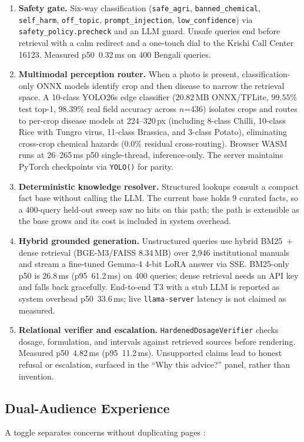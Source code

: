 \begin{enumerate}
    \item \textbf{Safety gate.} Six-way classification (\texttt{safe\_agri}, \texttt{banned\_chemical}, \texttt{self\_harm}, \texttt{off\_topic}, \texttt{prompt\_injection}, \texttt{low\_confidence}) via \texttt{safety\_policy.precheck} and an LLM guard. Unsafe queries end before retrieval with a calm redirect and a one-touch dial to the Krishi Call Center 16123. Measured p50~0.32\,ms on 400 Bengali queries.
    \item \textbf{Multimodal perception router.} When a photo is present, classification-only ONNX models identify crop and then disease to narrow the retrieval space. A 10-class YOLO26s edge classifier ($20.82$\,MB ONNX/TFLite, $99.55\%$ test top-1, $98.39\%$ real field accuracy across $n$=436) isolates crops and routes to per-crop disease models at 224--320\,px (including 8-class Chilli, 10-class Rice with Tungro virus, 11-class Brassica, and 3-class Potato), eliminating cross-crop chemical hazards ($0.0\%$ residual cross-routing). Browser WASM runs at 26--265\,ms p50 single-thread, inference-only. The server maintains PyTorch checkpoints via \texttt{YOLO()} for parity.
    \item \textbf{Deterministic knowledge resolver.} Structured lookups consult a compact fact base without calling the LLM. The current base holds 9 curated facts, so a 400-query held-out sweep saw no hits on this path; the path is extensible as the base grows and its cost is included in system overhead.
    \item \textbf{Hybrid grounded generation.} Unstructured queries use hybrid BM25~+ dense retrieval (BGE-M3/FAISS 8.34\,MB) over 2,946 institutional manuals and stream a fine-tuned Gemma-4 4-bit LoRA answer via SSE. BM25-only p50 is 26.8\,ms (p95~61.2\,ms) on 400 queries; dense retrieval needs an API key and falls back gracefully. End-to-end T3 with a stub LLM is reported as system overhead p50~33.6\,ms; live \texttt{llama-server} latency is not claimed as measured.
    \item \textbf{Relational verifier and escalation.} \texttt{HardenedDosageVerifier} checks dosage, formulation, and intervals against retrieved sources before rendering. Measured p50~4.82\,ms (p95~11.2\,ms). Unsupported claims lead to honest refusal or escalation, surfaced in the ``Why this advice?'' panel, rather than invention.
\end{enumerate}

\subsection{Dual-Audience Experience}
A toggle separates concerns without duplicating pages \citep{smartmatch2025}:

